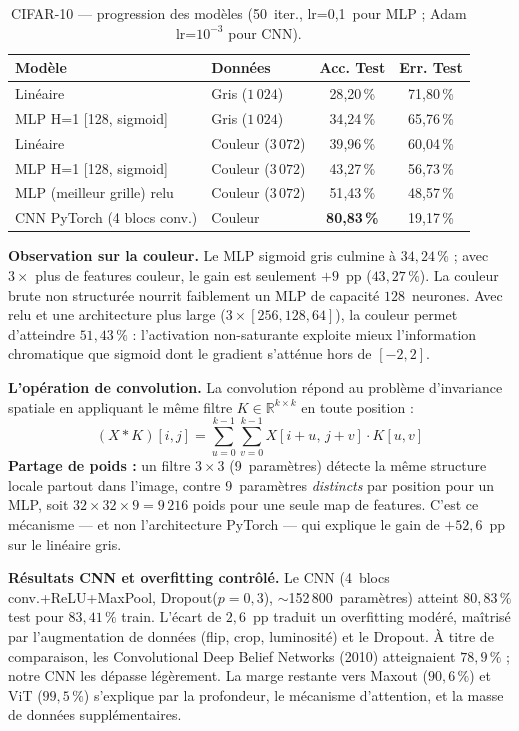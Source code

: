 \documentclass[10pt, a4paper]{article}
\begin{document}
\begin{table}[H]
\centering
\caption{CIFAR-10 — progression des modèles (50~iter., lr=0{,}1~pour MLP ; Adam lr=$10^{-3}$ pour CNN).}
\label{tab:cifar}
\begin{tabular}{llcc}
\toprule
\textbf{Modèle} & \textbf{Données} & \textbf{Acc. Test} & \textbf{Err. Test} \\
\midrule
Linéaire                   & Gris ($1\,024$)    & 28{,}20\,\% & 71{,}80\,\% \\
MLP H=1 [128, sigmoid]     & Gris ($1\,024$)    & 34{,}24\,\% & 65{,}76\,\% \\
Linéaire                   & Couleur ($3\,072$) & 39{,}96\,\% & 60{,}04\,\% \\
MLP H=1 [128, sigmoid]     & Couleur ($3\,072$) & 43{,}27\,\% & 56{,}73\,\% \\
MLP (meilleur grille) relu & Couleur ($3\,072$) & 51{,}43\,\% & 48{,}57\,\% \\
\midrule
CNN PyTorch (4 blocs conv.)& Couleur & \textbf{80{,}83\,\%} & 19{,}17\,\% \\
\bottomrule
\end{tabular}
\end{table}

\textbf{Observation sur la couleur.}
Le MLP sigmoid gris culmine à $34{,}24\,\%$ ; avec $3\times$ plus de features couleur,
le gain est seulement $+9$~pp ($43{,}27\,\%$).
La couleur brute non structurée nourrit faiblement un MLP de capacité $128$~neurones.
Avec relu et une architecture plus large ($3{\times}[256,128,64]$), la couleur permet
d'atteindre $51{,}43\,\%$ : l'activation non-saturante exploite mieux l'information
chromatique que sigmoid dont le gradient s'atténue hors de $[-2,2]$.

\textbf{L'opération de convolution.}
La convolution répond au problème d'invariance spatiale en appliquant le même filtre
$K \in \mathbb{R}^{k \times k}$ en toute position :
\[
  (X * K)[i,j] = \sum_{u=0}^{k-1}\sum_{v=0}^{k-1} X[i+u,\,j+v]\cdot K[u,v]
\]
\textbf{Partage de poids :} un filtre $3{\times}3$ (9~paramètres) détecte la même
structure locale partout dans l'image, contre 9~paramètres \emph{distincts} par position
pour un MLP, soit $32{\times}32\times 9 = 9\,216$ poids pour une seule map de features.
C'est ce mécanisme — et non l'architecture PyTorch — qui explique le gain de $+52{,}6$~pp
sur le linéaire gris.

\textbf{Résultats CNN et overfitting contrôlé.}
Le CNN (4~blocs conv.+ReLU+MaxPool, Dropout($p=0{,}3$), $\sim$152\,800~paramètres) atteint
$80{,}83\,\%$ test pour $83{,}41\,\%$ train.
L'écart de $2{,}6$~pp traduit un overfitting modéré, maîtrisé par l'augmentation de
données (flip, crop, luminosité) et le Dropout.
À titre de comparaison, les Convolutional Deep Belief Networks (2010) atteignaient
$78{,}9\,\%$ ; notre CNN les dépasse légèrement.
La marge restante vers Maxout ($90{,}6\,\%$) et ViT ($99{,}5\,\%$) s'explique par la
profondeur, le mécanisme d'attention, et la masse de données supplémentaires.
\end{document}
